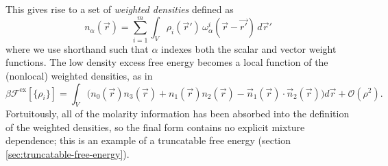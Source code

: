 This gives rise to a set of \emph{weighted densities} defined as \cite{RosenfeldPRL1989,PercusJSP1988}
\begin{equation}
  n_\alpha(\vec{r})
  =
  \sum_{i=1}^m \int_V
  \rho_i(\vec{r}') \, \omega_\alpha^i(\vec{r} - \vec{r'})
  \, d\vec{r}'
\end{equation}
where we use shorthand such that $\alpha$ indexes both the scalar and vector weight functions.
The low density excess free energy becomes a local function of the (nonlocal) weighted densities, as in
\begin{equation*}
  \beta \mathcal{F}^\mathrm{ex}[\{\rho_i\}]
  =
  \int_V \Big(
  n_0(\vec{r}) n_3(\vec{r})
  + n_1(\vec{r}) n_2(\vec{r})
  - \vec{n}_1(\vec{r}) \cdot \vec{n}_2(\vec{r})
  \Big) d\vec{r}
  + \mathcal{O}(\rho^2).
\end{equation*}
Fortuitously, all of the molarity information has been absorbed into the definition of the weighted densities, so the final form contains no explicit mixture dependence; this is an example of a truncatable free energy (section \ref{sec:truncatable-free-energy}).

